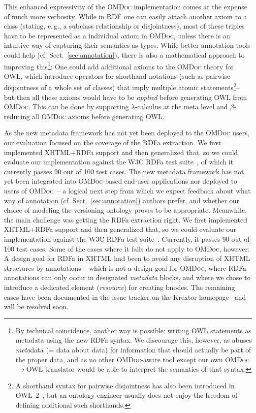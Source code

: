 \documentclass{llncs}
\renewcommand{\omdoc}{\textsc{OMDoc}\xspace}
\begin{document}
This enhanced expressivity of the \omdoc implementation comes at the expense of much more
verbosity.  While in RDF one can easily attach another axiom to a class (stating, e.\,g.,
a subclass relationship or disjointness), most of these triples have to be represented as
a individual axiom in \omdoc, unless there is an intuitive way of capturing their
semantics as types.  While better annotation tools could help (cf.
Sect.~\ref{sec:annotation}), there is also a mathematical approach to improving
this\ifpublic\else\footnote{By technical coincidence, another way is possible: writing OWL
  statements as metadata using the new RDFa syntax.  We discourage this, however, as
  abuses \emph{meta}data (= data about data) for information that should actually be part
  of the proper data, and as no other \omdoc-aware tool except our own {\omdoc}$\to$OWL
  translator would be able to interpret the semantics of that syntax.}\fi: One could add
additional axioms to the \omdoc theory for OWL, which introduce operators for shorthand
notations (such as pairwise disjointness of a whole set of classes) that imply multiple
atomic statements\ifpublic\else\footnote{A shorthand syntax for pairwise disjointness has
  also been introduced in OWL~2~\cite{w3c:owl2-syntax}, but an ontology engineer usually
  does not enjoy the freedom of defining additional such shorthands.}\fi -- but then all
these axioms would have to be \emph{applied} before generating OWL from \omdoc.  This can
be done by supporting $\lambda$-calculus at the meta level and $\beta$-reducing all \omdoc
axioms before generating OWL.

\ifpublic%
As the new metadata framework has not yet been deployed to the \omdoc users, our
evaluation focused on the coverage of the RDFa extraction.  We first implemented
XHTML+RDFa support and then generalized that, so we could evaluate our implementation
against the W3C RDFa test suite~\cite{W3C:RDFaTestSuite}, of which it currently passes 90
out of 100 test cases.%
\else%
The new metadata framework has not yet been integrated into \omdoc-based end-user
applications nor deployed to users of \omdoc\ -- a logical next step from which we expect
feedback about what way of annotation (cf. Sect.~\ref{sec:annotation}) authors prefer,
and whether our choice of modeling the versioning ontology proves to be appropriate.
Meanwhile, the main challenge was getting the RDFa extraction right.  We first implemented
XHTML+RDFa support and then generalized that, so we could evaluate our implementation
against the W3C RDFa test suite~\cite{W3C:RDFaTestSuite}.  Currently, it passes 90 out of
100 test cases.  Some of the cases where it fails do not apply to \omdoc, however: A
design goal for RDFa in XHTML had been to avoid any disruption of XHTML structures by
annotations -- which is not a design goal for \omdoc, where RDFa annotations can only
occur in designated \textit{metadata} blocks, and where we chose to introduce a dedicated
element (\textit{resource}) for creating bnodes.  The remaining cases have been documented
in the issue tracker on the Krextor homepage~\cite{krextor:webpage} and will be resolved
soon.%
\fi%
\end{document}
